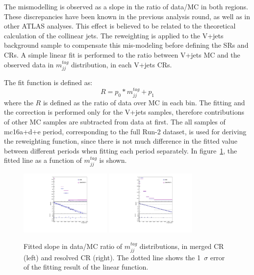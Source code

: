 The mismodelling is observed as a slope in the ratio of data/MC in both regions.
These discrepancies have been known in the previous analysis round, as well as in other ATLAS analyses. 
This effect is believed to be related to the theoretical calculation of the collinear jets.
The reweighting is applied to the V+jets background sample to compensate this mis-modeling before defining the SRs and CRs. 
A simple linear fit is performed to the ratio between V+jets MC and the observed data in $m^{tag}_{jj}$ distribution, in each V+jets CRs. 

The fit function is defined as:
\begin{equation}
\label{eqn:reweight}
R=p_{0} * m_{jj}^{tag}+p_{1}
\end{equation}
where the $R$ is defined as the ratio of data over MC in each bin.
The fitting and the correction is performed only for the V+jets samples, therefore contributions of other MC samples are subtracted from data at first. 
The all samples of mc16a+d+e period, corresponding to the full Run-2 dataset, is used for deriving the reweighting function, since there is not much difference in the fitted value between different periods when fitting each period separately. 
In figure~\ref{fig:LinearFit}, the fitted line as a function of $m^{tag}_{jj}$ is shown. 

\begin{figure}[ht]
    \centering
    \includegraphics[width=0.40\textwidth]{figures/2lep/reweighting/MTagMerJets_0ptag1pfat0pjet_0ptv_CRVjet_finerbin}
    \includegraphics[width=0.40\textwidth]{figures/2lep/reweighting/MTagResJets_0ptag2pjet_0ptv_CRVjet_Fid_finerbin}
    \caption{ Fitted slope in data/MC ratio of $m^{tag}_{jj}$ distributions, in merged CR (left) and resolved CR (right). The dotted line shows the 1~$\sigma$ error of the fitting result of the linear function. }
    \label{fig:LinearFit}
\end{figure}


